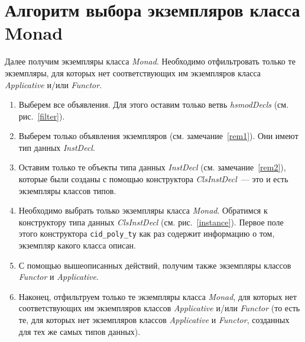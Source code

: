 \section{Алгоритм выбора экземпляров класса Monad}\label{filtermonad}
Далее получим экземпляры класса \textit{Monad}. Необходимо отфильтровать только те экземпляры, для которых нет соответствующих им экземпляров класса \textit{Applicative}  и/или \textit{Functor}.
\begin{enumerate}
\item Выберем все объявления. Для этого оставим только ветвь \textit{hsmodDecls} (см. рис.~\ref{filter}).
\item Выберем только объявления экземпляров (см. замечание~\ref{rem1}). Они имеют тип данных \textit{InstDecl}.
\item Оставим только те объекты типа данных \textit{InstDecl} (см. замечание~\ref{rem2}), которые были созданы с помощью конструктора \textit{ClsInstDecl}~--- это и есть экземпляры классов типов.
\item Необходимо выбрать только экземпляры класса \textit{Monad}. Обратимся к конструктору типа данных \textit{ClsInstDecl} (см. рис.~\ref{instance}). Первое поле этого конструктора \lstinline{cid_poly_ty} как раз содержит информацию о том, экземпляр какого класса описан. 
\item С помощью вышеописанных действий, получим также экземпляры классов \textit{Functor} и \textit{Applicative}.
\item Наконец, отфильтруем только те экземпляры класса \textit{Monad}, для которых нет соответствующих им экземпляров классов \textit{Applicative} и/или \textit{Functor} (то есть те, для которых нет экземпляров классов \textit{Applicative} и \textit{Functor}, созданных для тех же самых типов данных).
\end{enumerate}

\label{rem1}

